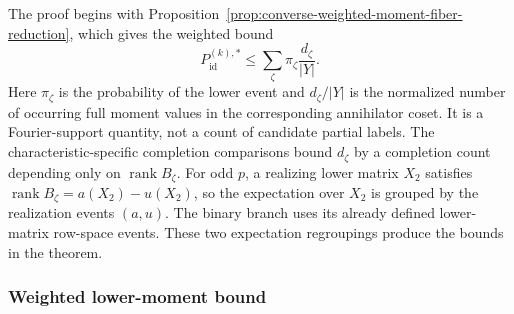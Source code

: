 \documentclass[11pt]{article}
\newcommand{\rank}{\operatorname{rank}}
\newcommand{\1}{\mathbf 1}
\theoremstyle{plain}
\theoremstyle{definition}
\theoremstyle{remark}
\begin{document}
The proof begins with Proposition~\ref{prop:converse-weighted-moment-fiber-reduction},
which gives the weighted bound
\[
 P_{\mathrm{id}}^{(k),*}
 \le \sum_\zeta\pi_\zeta\frac{d_\zeta}{\lvert Y\rvert}.
\]
Here $\pi_\zeta$ is the probability of the lower event and
$d_\zeta/\lvert Y\rvert$ is the normalized number of occurring full moment
values in the corresponding annihilator coset.  It is a Fourier-support
quantity, not a count of candidate partial labels.  The characteristic-specific
completion comparisons bound $d_\zeta$ by a completion count depending only
on $\rank B_\zeta$.  For odd $p$, a realizing lower matrix $X_2$ satisfies
$\rank B_\zeta=a(X_2)-u(X_2)$, so the expectation over $X_2$ is grouped by the
realization events $(a,u)$.  The binary branch uses its already defined
lower-matrix row-space events.  These two expectation regroupings produce the
bounds in the theorem.

\subsubsection{Weighted lower-moment bound}
\end{document}
